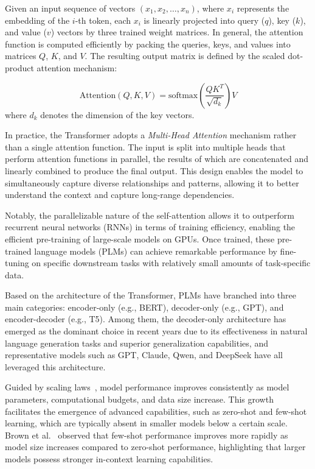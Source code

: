 Given an input sequence of vectors $(x_1, x_2, \ldots, x_n)$, where $x_i$ represents the embedding of the $i$-th token, each $x_i$ is linearly projected into query ($q$), key ($k$), and value ($v$) vectors by three trained weight matrices. In general, the attention function is computed efficiently by packing the queries, keys, and values into matrices $Q$, $K$, and $V$. The resulting output matrix is defined by the scaled dot-product attention mechanism:

\begin{equation}\label{eq:attention}
\text{Attention}(Q, K, V) = \text{softmax}\left(\frac{QK^T}{\sqrt{d_k}}\right)V
\end{equation}
where $d_k$ denotes the dimension of the key vectors.

In practice, the Transformer adopts a \textit{Multi-Head Attention} mechanism rather than a single attention function. The input is split into multiple heads that perform attention functions in parallel, the results of which are concatenated and linearly combined to produce the final output. This design enables the model to simultaneously capture diverse relationships and patterns, allowing it to better understand the context and capture long-range dependencies.

Notably, the parallelizable nature of the self-attention allows it to outperform recurrent neural networks (RNNs) in terms of training efficiency, enabling the efficient pre-training of large-scale models on GPUs. Once trained, these pre-trained language models (PLMs) can achieve remarkable performance by fine-tuning on specific downstream tasks with relatively small amounts of task-specific data.

Based on the architecture of the Transformer, PLMs have branched into three main categories: encoder-only (e.g., BERT), decoder-only (e.g., GPT), and encoder-decoder (e.g., T5). Among them, the decoder-only architecture has emerged as the dominant choice in recent years due to its effectiveness in natural language generation tasks and superior generalization capabilities, and representative models such as GPT, Claude, Qwen, and DeepSeek have all leveraged this architecture.

Guided by scaling laws~\cite{kaplan2020scaling}, model performance improves consistently as model parameters, computational budgets, and data size increase. This growth facilitates the emergence of advanced capabilities, such as zero-shot and few-shot learning, which are typically absent in smaller models below a certain scale. Brown et al.~\cite{brown2020language} observed that few-shot performance improves more rapidly as model size increases compared to zero-shot performance, highlighting that larger models possess stronger in-context learning capabilities.

